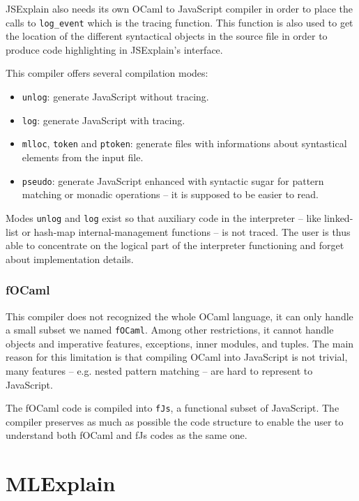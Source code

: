 \documentclass[twocolumn]{article}
\begin{document}
JSExplain also needs its own OCaml to JavaScript compiler in order to place the
calls to \verb|log_event| which is the tracing function. This function is also
used to get the location of the different syntactical objects in the source
file in order to produce code highlighting in JSExplain's interface.

This compiler offers several compilation modes:

\begin{itemize}
  \item \texttt{unlog}: generate JavaScript without tracing.
  \item \texttt{log}: generate JavaScript with tracing.
  \item \texttt{mlloc}, \texttt{token} and \texttt{ptoken}: generate files with
    informations about syntastical elements from the input file.
  \item \texttt{pseudo}: generate JavaScript enhanced with syntactic sugar for
    pattern matching or monadic operations -- it is supposed to be easier to
    read.
\end{itemize}

Modes \texttt{unlog} and \texttt{log} exist so that auxiliary code in the
interpreter -- like linked-list or hash-map internal-management functions -- is
not traced.  The user is thus able to concentrate on the logical part of the
interpreter functioning and forget about implementation details.

\subsubsection{fOCaml}
This compiler does not recognized the whole OCaml language, it can only handle
a small subset we named \texttt{fOCaml}. Among other restrictions, it cannot
handle objects and imperative features, exceptions, inner modules, and tuples.
The main reason for this limitation is that compiling OCaml into JavaScript is
not trivial, many features -- e.g. nested pattern matching -- are hard to
represent to JavaScript.

The fOCaml code is compiled into \texttt{fJs}, a functional subset of
JavaScript. The compiler preserves as much as possible the code structure to
enable the user to understand both fOCaml and fJs codes as the same one.


\section{MLExplain}
\end{document}
